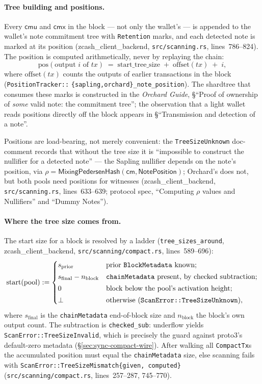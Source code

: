 \documentclass[11pt,a4paper]{article}
\theoremstyle{definition}
\newcommand{\cmsym}{\mathsf{cm}}
\newcommand{\cmx}{\mathsf{cmx}}
\begin{document}
\paragraph{Tree building and positions.} Every $\mathsf{cmu}$ and $\cmx$ in
the block --- not only the wallet's --- is appended to the wallet's note
commitment tree with \texttt{Retention} marks, and each detected note is
marked at its position (\textsf{zcash\_client\_backend},
\texttt{src/scanning.rs}, lines~786--824). The position is computed
arithmetically, never by replaying the chain:
\[
\mathrm{pos}(\text{output } i \text{ of } tx)
  \;=\; \mathrm{start\_tree\_size} \;+\; \mathrm{offset}(tx) \;+\; i,
\]
where $\mathrm{offset}(tx)$ counts the outputs of earlier transactions in
the block (\texttt{PositionTracker::}\allowbreak%
\texttt{\{sapling,orchard\}\_note\_position}). The
shardtree that consumes these marks is constructed in the \emph{Orchard
Guide}, \S``Proof of ownership of \emph{some} valid note: the commitment
tree''; the observation that a light wallet reads positions directly off the
block appears in \S``Transmission and detection of a note''.

Positions are load-bearing, not merely convenient: the
\texttt{TreeSizeUnknown} doc-comment records that without the tree size it
is ``impossible to construct the nullifier for a detected note'' --- the
Sapling nullifier depends on the note's position, via $\rho =
\mathsf{MixingPedersenHash}(\cmsym, \mathsf{NotePosition})$; Orchard's does
not, but both pools need positions for witnesses
(\textsf{zcash\_client\_backend}, \texttt{src/scanning.rs}, lines~633--639;
protocol spec, ``Computing $\rho$ values and Nullifiers'' and ``Dummy
Notes'').

\paragraph{Where the tree size comes from.} The start size for a block is
resolved by a ladder (\texttt{tree\_sizes\_around},
\textsf{zcash\_client\_backend}, \texttt{src/scanning/compact.rs},
lines~589--696):
\[
\mathrm{start}(\mathrm{pool}) :=
\begin{cases}
s_{\mathrm{prior}} & \text{prior \texttt{BlockMetadata} known;}\\[2pt]
s_{\mathrm{final}} - n_{\mathrm{block}} &
  \text{\texttt{chainMetadata} present, by checked subtraction;}\\[2pt]
0 & \text{block below the pool's activation height;}\\[2pt]
\bot & \text{otherwise (\texttt{ScanError::TreeSizeUnknown}),}
\end{cases}
\]
where $s_{\mathrm{final}}$ is the \texttt{chainMetadata} end-of-block size
and $n_{\mathrm{block}}$ the block's own output count. The subtraction is
\texttt{checked\_sub}: underflow yields
\texttt{ScanError::TreeSizeInvalid}, which is precisely the guard against
proto3's default-zero metadata (\S\ref{sec:sync-compact-wire}). After
walking all \texttt{CompactTx}s the accumulated position must equal the
\texttt{chainMetadata} size, else scanning fails with
\texttt{ScanError::TreeSizeMismatch\{given, computed\}}
(\texttt{src/scanning/compact.rs}, lines~257--287, 745--770).
\end{document}
